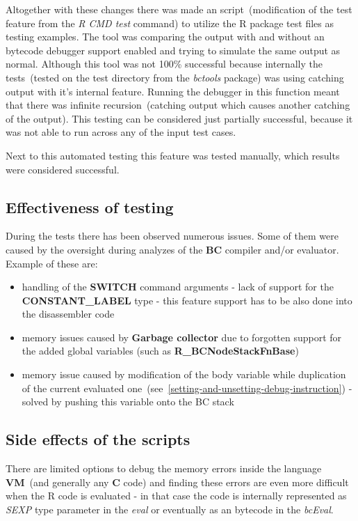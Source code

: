\documentclass[thesis=M,english]{FITthesis}[2018/10/20]
\begin{document}
Altogether with these changes there was made an script~(modification of the test feature from the \textit{R CMD test} command) to utilize the R package test files as testing examples. The tool was comparing the output with and without an bytecode debugger support enabled and trying to simulate the same output as normal. Although this tool was not 100\% successful because internally the tests~(tested on the test directory from the \textit{bctools} package) was using catching output with it's internal feature. Running the debugger in this function meant that there was infinite recursion~(catching output which causes another catching of the output). This testing can be considered just partially successful, because it was not able to run across any of the input test cases. 

Next to this automated testing this feature was tested manually, which results were considered successful.

\subsection{Effectiveness of testing}

During the tests there has been observed numerous issues. Some of them were caused by the oversight during analyzes of the \textbf{BC} compiler and/or evaluator. Example of these are:
\begin{itemize}
	\item handling of the \textbf{SWITCH} command arguments - lack of support for the \textbf{CONSTANT{\_}LABEL} type - this feature support has to be also done into the disassembler code
	\item memory issues caused by \textbf{Garbage collector} due to forgotten support for the added global variables (such as \textbf{R{\_}BCNodeStackFnBase})
	\item memory issue caused by modification of the body variable while duplication of the current evaluated one~(see~\ref{setting-and-unsetting-debug-instruction}) - solved by pushing this variable onto the BC stack
\end{itemize}

\subsection{Side effects of the scripts}

There are limited options to debug the memory errors inside the language \textbf{VM}~(and generally any \textbf{C} code) and finding these errors are even more difficult when the  R code is evaluated - in that case the code is internally represented as \textit{SEXP} type parameter in the \textit{eval} or eventually as an bytecode in the \textit{bcEval}. 
\end{document}

